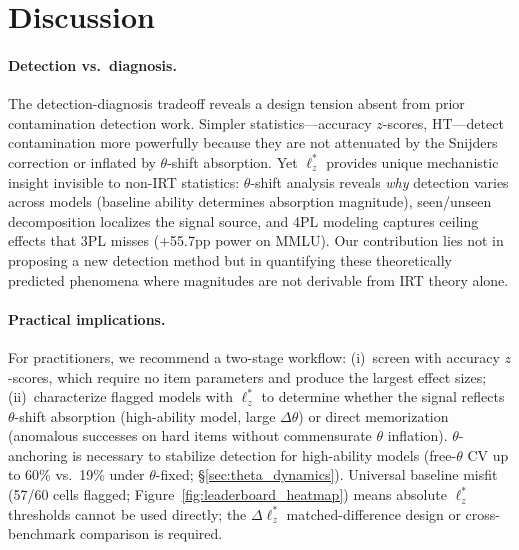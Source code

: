 \section{Discussion}\label{sec:discussion}

\paragraph{Detection vs.\ diagnosis.}
The detection-diagnosis tradeoff reveals a design tension absent from prior contamination detection work.
Simpler statistics---accuracy $z$-scores, HT---detect contamination more powerfully because they are not attenuated by the Snijders correction or inflated by $\theta$-shift absorption.
Yet $\ell_z^*$ provides unique mechanistic insight invisible to non-IRT statistics: $\theta$-shift analysis reveals \emph{why} detection varies across models (baseline ability determines absorption magnitude), seen/unseen decomposition localizes the signal source, and 4PL modeling captures ceiling effects that 3PL misses ($+$55.7pp power on MMLU).
Our contribution lies not in proposing a new detection method but in quantifying these theoretically predicted phenomena where magnitudes are not derivable from IRT theory alone.

\paragraph{Practical implications.}
For practitioners, we recommend a two-stage workflow: (i)~screen with accuracy $z$-scores, which require no item parameters and produce the largest effect sizes; (ii)~characterize flagged models with $\ell_z^*$ to determine whether the signal reflects $\theta$-shift absorption (high-ability model, large $\Delta\theta$) or direct memorization (anomalous successes on hard items without commensurate $\theta$ inflation).
$\theta$-anchoring is necessary to stabilize detection for high-ability models (free-$\theta$ CV up to 60\% vs.\ 19\% under $\theta$-fixed; \S\ref{sec:theta_dynamics}).
Universal baseline misfit (57/60 cells flagged; Figure~\ref{fig:leaderboard_heatmap}) means absolute $\ell_z^*$ thresholds cannot be used directly; the $\Delta\ell_z^*$ matched-difference design or cross-benchmark comparison is required.


